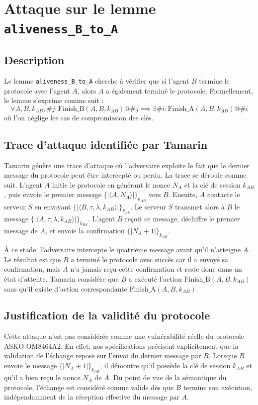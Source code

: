 \section{Attaque sur le lemme \texttt{aliveness\_B\_to\_A}}

\subsection{Description}

Le lemme \texttt{aliveness\_B\_to\_A} cherche à vérifier que si l'agent $B$ termine le protocole
avec l'agent $A$, alors $A$ a également terminé le protocole. Formellement, le lemme s'exprime
comme suit :
\[
    \forall A, B, k_{AB}, \#j : \text{Finish\_B}(A, B, k_{AB}) @ \#j \implies
    \exists \#i : \text{Finish\_A}(A, B, k_{AB}) @ \#i
\]
où l'on néglige les cas de compromission des clés.

\subsection{Trace d'attaque identifiée par Tamarin}

Tamarin génère une trace d'attaque où l'adversaire exploite le fait que le dernier message du
protocole peut être intercepté ou perdu. La trace se déroule comme suit. L'agent $A$ initie le
protocole en générant le nonce $N_A$ et la clé de session $k_{AB}$, puis envoie le premier
message $\{|\langle A, N_A \rangle|\}_{k_{AB}}$ vers $B$. Ensuite, $A$ contacte le serveur $S$
en envoyant $\{|\langle B, \tau, \lambda, k_{AB} \rangle|\}_{k_{AS}}$. Le serveur $S$ transmet
alors à $B$ le message $\{|\langle A, \tau, \lambda, k_{AB} \rangle|\}_{k_{BS}}$. L'agent $B$
reçoit ce message, déchiffre le premier message de $A$, et envoie la confirmation
$\{|N_A + 1|\}_{k_{AB}}$.

À ce stade, l'adversaire intercepte le quatrième message avant qu'il n'atteigne $A$. Le résultat
est que $B$ a terminé le protocole avec succès car il a envoyé sa confirmation, mais $A$ n'a
jamais reçu cette confirmation et reste donc dans un état d'attente. Tamarin considère que $B$
a exécuté l'action $\text{Finish\_B}(A, B, k_{AB})$ sans qu'il existe d'action correspondante
$\text{Finish\_A}(A, B, k_{AB})$.

\subsection{Justification de la validité du protocole}

Cette attaque n'est pas considérée comme une vulnérabilité réelle du protocole ASKO-OM8464A2.
En effet, nos spécifications précisent explicitement que la validation de l'échange repose sur
l'envoi du dernier message par $B$. Lorsque $B$ envoie le message $\{|N_A + 1|\}_{k_{AB}}$, il
démontre qu'il possède la clé de session $k_{AB}$ et qu'il a bien reçu le nonce $N_A$ de $A$.
Du point de vue de la sémantique du protocole, l'échange est considéré comme valide dès que $B$
termine son exécution, indépendamment de la réception effective du message par $A$.

